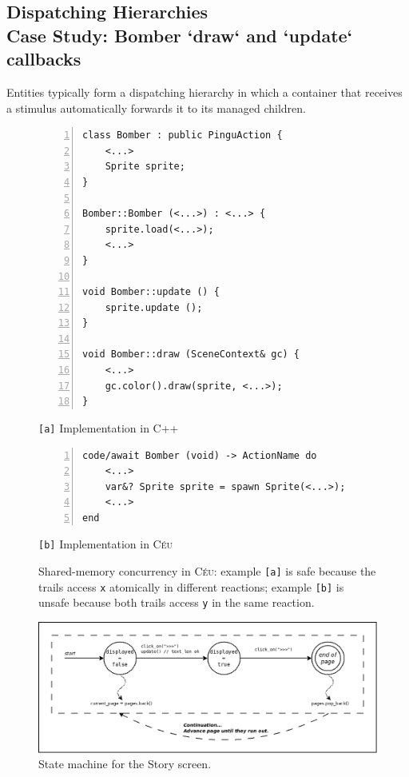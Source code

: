 \documentclass{vgtc}                          %
\newcommand{\CEU}{\textsc{C\'{e}u}\xspace}
\newcommand{\code}[1] {{\small{\texttt{#1}}}}
\newcommand{\ax}{\code{[a]}\xspace}
\newcommand{\bx}{\code{[b]}\xspace}
\begin{document}
\subsection{Dispatching Hierarchies \\ Case Study: Bomber `draw` and `update` callbacks}

Entities typically form a dispatching hierarchy in which a container that
receives a stimulus automatically forwards it to its managed children.

\begin{figure}
\begin{minipage}[t]{0.50\linewidth}
\begin{lstlisting}[numbers=left,xleftmargin=3em]
class Bomber : public PinguAction {
    <...>
    Sprite sprite;
}

Bomber::Bomber (<...>) : <...> {
    sprite.load(<...>);
    <...>
}

void Bomber::update () {
    sprite.update ();
}

void Bomber::draw (SceneContext& gc) {
    <...>
    gc.color().draw(sprite, <...>);
}
\end{lstlisting}
\centering\small{\ax Implementation in C++}
\end{minipage}
%
\begin{minipage}[t]{0.50\linewidth}
\begin{lstlisting}[numbers=left,xleftmargin=3em]
code/await Bomber (void) -> ActionName do
    <...>
    var&? Sprite sprite = spawn Sprite(<...>);
    <...>
end
\end{lstlisting}
\centering\small{\bx Implementation in \CEU}
\end{minipage}
\caption{ Shared-memory concurrency in \CEU:
example \ax is safe because the trails access \code{x} atomically in different 
reactions;
example \bx is unsafe because both trails access \code{y} in the same reaction.
\label{lst.shared}
}
\end{figure}

\begin{figure}
\centering
\includegraphics[width=\columnwidth]{story}
\caption{State machine for the Story screen.
\label{fig.story}
}
\end{figure}
\end{document}
